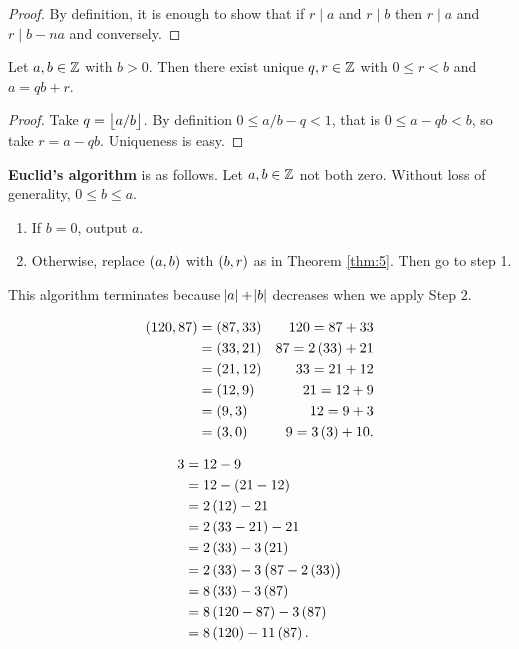 \begin{proof}
By definition, it is enough to show that if $ r \mid a $ and $ r \mid b $ then $ r \mid a $ and $ r \mid b - na $ and conversely.
\end{proof}

\begin{theorem}
\label{thm:5}
Let $ a, b \in \mathbb{Z} $ with $ b > 0 $. Then there exist unique $ q, r \in \mathbb{Z} $ with $ 0 \le r < b $ and $ a = qb + r $.
\end{theorem}

\begin{proof}
Take $ q = \left\lfloor a / b \right\rfloor $. By definition $ 0 \le a / b - q < 1 $, that is $ 0 \le a - qb < b $, so take $ r = a - qb $. Uniqueness is easy.
\end{proof}

\textbf{Euclid's algorithm} is as follows. Let $ a, b \in \mathbb{Z} $ not both zero. Without loss of generality, $ 0 \le b \le a $.
\begin{enumerate}[leftmargin=0.5in, label=Step \arabic*.]
\item If $ b = 0 $, output $ a $.
\item Otherwise, replace $ \br{a, b} $ with $ \br{b, r} $ as in Theorem \ref{thm:5}. Then go to step 1.
\end{enumerate}
This algorithm terminates because $ \abs{a} + \abs{b} $ decreases when we apply Step $ 2 $.

\begin{example*}
\hfill

\begin{minipage}{0.5\textwidth}
\begin{align*}
\br{120, 87}
& = \br{87, 33} & 120 = 87 + 33 \\
& = \br{33, 21} & 87 = 2\br{33} + 21 \\
& = \br{21, 12} & 33 = 21 + 12 \\
& = \br{12, 9} & 21 = 12 + 9 \\
& = \br{9, 3} & 12 = 9 + 3 \\
& = \br{3, 0} & 9 = 3\br{3} + 10.
\end{align*}
\end{minipage}
\begin{minipage}{0.4\textwidth}
\begin{align*}
3
& = 12 - 9 \\
& = 12 - \br{21 - 12} \\
& = 2\br{12} - 21 \\
& = 2\br{33 - 21} - 21 \\
& = 2\br{33} - 3\br{21} \\
& = 2\br{33} - 3\br{87 - 2\br{33}} \\
& = 8\br{33} - 3\br{87} \\
& = 8\br{120 - 87} - 3\br{87} \\
& = 8\br{120} - 11\br{87}.
\end{align*}
\end{minipage}
\end{example*}

